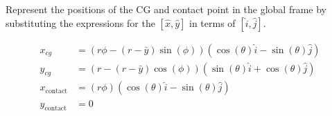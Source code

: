 Represent the positions of the CG and contact point in the global frame by substituting the expressions for the $\left[\hat{x}, \hat{y}\right]$ in terms of $\left[\hat{i}, \hat{j}\right]$.

\begin{solution}
\begin{align*}
    x_{c g} &= (r \phi-(r-\bar{y}) \sin (\phi))(\cos (\theta) \hat{i}-\sin (\theta) \hat{j}) \\
    y_{c g} &= (r-(r-\bar{y}) \cos (\phi))(\sin (\theta) \hat{i}+\cos (\theta) \hat{j}) \\
    x_{\text {contact}} &= (r \phi)(\cos (\theta) \hat{i}-\sin (\theta) \hat{j}) \\
    y_{\text {contact}} &= 0
\end{align*}
\end{solution}